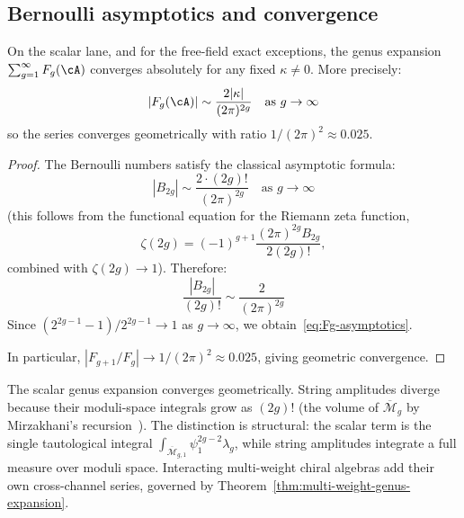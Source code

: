 \subsection{Bernoulli asymptotics and convergence}\label{subsec:bernoulli-asymptotics}

\begin{proposition}\label{prop:genus-expansion-convergence}

On the scalar lane, and for the free-field exact exceptions,
the genus expansion $\sum_{g=1}^\infty F_g(\cA)$ converges
absolutely for any fixed $\kappa \neq 0$. More precisely:
\begin{equation}\label{eq:Fg-asymptotics}
|F_g(\cA)| \sim \frac{2|\kappa|}{(2\pi)^{2g}} \quad \text{as } g \to \infty
\end{equation}
so the series converges geometrically with ratio $1/(2\pi)^2 \approx 0.025$.
\end{proposition}

\begin{proof}
The Bernoulli numbers satisfy the classical asymptotic formula:
\[
|B_{2g}| \sim \frac{2 \cdot (2g)!}{(2\pi)^{2g}} \quad \text{as } g \to \infty
\]
(this follows from the functional equation for the Riemann zeta function,
\[
\zeta(2g) = (-1)^{g+1} \frac{(2\pi)^{2g} B_{2g}}{2(2g)!},
\]
combined with $\zeta(2g) \to 1$). Therefore:
\[
\frac{|B_{2g}|}{(2g)!} \sim \frac{2}{(2\pi)^{2g}}
\]
Since $(2^{2g-1}-1)/2^{2g-1} \to 1$ as $g \to \infty$, we obtain~\eqref{eq:Fg-asymptotics}.

In particular, $|F_{g+1}/F_g| \to 1/(2\pi)^2 \approx 0.025$, giving geometric convergence.
\end{proof}

\begin{remark}\label{rem:convergence-vs-string}

The scalar genus expansion converges geometrically. String
amplitudes diverge because their moduli-space integrals grow as
$(2g)!$ (the volume of $\overline{\mathcal{M}}_g$ by
Mirzakhani's recursion~\cite{Mirzakhani}). The distinction is
structural: the scalar term is the single tautological integral
$\int_{\overline{\mathcal{M}}_{g,1}}\psi_1^{2g-2}\lambda_g$,
while string amplitudes integrate a full measure over moduli space.
Interacting multi-weight chiral algebras add their own
cross-channel series, governed by
Theorem~\ref{thm:multi-weight-genus-expansion}.
\end{remark}


